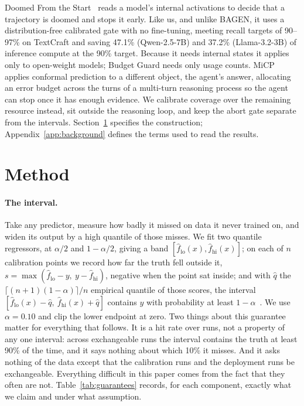 \documentclass{article}
\begin{document}
Doomed From the Start~\cite{ruan2026doomed} reads a model's internal activations to decide that a trajectory is doomed and stops it early. Like us, and unlike BAGEN, it uses a distribution-free calibrated gate with no fine-tuning, meeting recall targets of 90--97\% on TextCraft and saving 47.1\% (Qwen-2.5-7B) and 37.2\% (Llama-3.2-3B) of inference compute at the 90\% target. Because it needs internal states it applies only to open-weight models; Budget Guard needs only usage counts. MiCP~\cite{zhou2026adaptive} applies conformal prediction to a different object, the agent's answer, allocating an error budget across the turns of a multi-turn reasoning process so the agent can stop once it has enough evidence. We calibrate coverage over the remaining resource instead, sit outside the reasoning loop, and keep the abort gate separate from the intervals. Section~\ref{sec:method} specifies the construction; Appendix~\ref{app:background} defines the terms used to read the results.

\FloatBarrier
\section{Method}
\label{sec:method}

\paragraph{The interval.}
Take any predictor, measure how badly it missed on data it never trained on, and widen its output by a high quantile of those misses. We fit two quantile regressors, at $\alpha/2$ and $1{-}\alpha/2$, giving a band $[\hat f_{\mathrm{lo}}(x), \hat f_{\mathrm{hi}}(x)]$; on each of $n$ calibration points we record how far the truth fell outside it, $s=\max(\hat f_{\mathrm{lo}}-y,\ y-\hat f_{\mathrm{hi}})$, negative when the point sat inside; and with $\hat q$ the $\lceil (n+1)(1{-}\alpha)\rceil/n$ empirical quantile of those scores, the interval $[\hat f_{\mathrm{lo}}(x)-\hat q,\ \hat f_{\mathrm{hi}}(x)+\hat q]$ contains $y$ with probability at least $1{-}\alpha$~\cite{romano2019cqr}. We use $\alpha{=}0.10$ and clip the lower endpoint at zero. Two things about this guarantee matter for everything that follows. It is a hit rate over runs, not a property of any one interval: across exchangeable runs the interval contains the truth at least 90\% of the time, and it says nothing about which 10\% it misses. And it asks nothing of the data except that the calibration runs and the deployment runs be exchangeable. Everything difficult in this paper comes from the fact that they often are not. Table~\ref{tab:guarantees} records, for each component, exactly what we claim and under what assumption.
\end{document}
